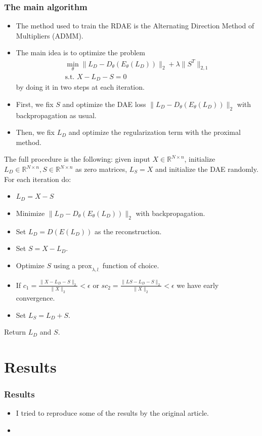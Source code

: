 \documentclass{beamer}
\theoremstyle{plain}
\theoremstyle{definition}
\theoremstyle{remark}
\newcommand{\R}{\mathbb{R}}
\newcommand{\norm}[1]{\lVert#1\rVert}
\newcommand{\prox}{\text{prox}}
\begin{document}
\begin{frame}
	\frametitle{The main algorithm}
	\begin{itemize}
		\item The method used to train the RDAE is the Alternating Direction Method of Multipliers (ADMM).
		\item The main idea is to optimize the problem
			\begin{align}
				\min_{\theta}{\norm{L_D -D_{\theta}(E_{\theta}(L_D))}_2 + \lambda\norm{S^T}_{2,1}}\\
				\text{s.t. }X-L_D-S=0  
			\end{align}
			by doing it in two steps at each iteration.
		\item First, we fix $S$ and optimize the DAE loss $\norm{L_D -D_{\theta}(E_{\theta}(L_D))}_2$ with backpropagation as usual.
		\item Then, we fix $L_D$ and optimize the regularization term with the proximal method.
	\end{itemize}
\end{frame}

\begin{frame}
	The full procedure is the following: given input $X\in \R^{N\times n}$, initialize $L_D\in \R^{N\times n}, S\in \R^{N\times n}$ as zero matrices, 
	$L_S = X$ and initialize the DAE randomly. For each iteration do:
	\begin{itemize}
		\item $L_D = X - S$
		\item Minimize $\norm{L_D -D_{\theta}(E_{\theta}(L_D))}_2$ with backpropagation.
		\item Set $L_D = D(E(L_D))$ as the reconstruction.
		\item Set $S = X - L_D$.
		\item Optimize $S$ using a $\prox_{\lambda, l_{\cdot}}$ function of choice.
		\item If $c_1 = \frac{\norm{X-L_D-S}_2}{\norm{X}_2} < \epsilon$ or $sc_2 = \frac{\norm{LS-L_D-S}_2}{\norm{X}_2} < \epsilon$ we have early convergence.
		\item Set $L_S = L_D + S$.
	\end{itemize}
	Return $L_D$ and $S$.
\end{frame}

\section{Results}

\begin{frame}
	\frametitle{Results}
	\begin{itemize}
		\item I tried to reproduce some of the results by the original article.
		\item 
	\end{itemize}
\end{frame}
\end{document}
